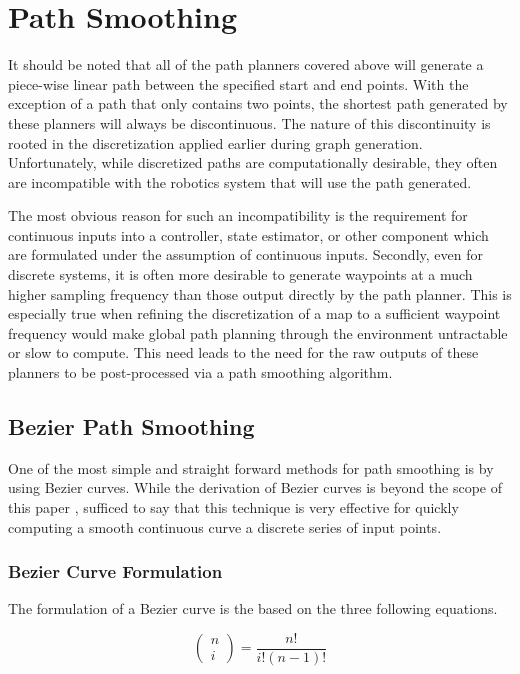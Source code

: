 \section{Path Smoothing}
It should be noted that all of the path planners covered above will generate a piece-wise linear path between the specified start and end points. With the exception of a path that only contains two points, the shortest path generated by these planners will always be discontinuous. The nature of this discontinuity is rooted in the discretization applied earlier during graph generation. Unfortunately, while discretized paths are computationally desirable, they often are incompatible with the robotics system that will use the path generated.

The most obvious reason for such an incompatibility is the requirement for continuous inputs into a controller, state estimator, or other component which are formulated under the assumption of continuous inputs. Secondly, even for discrete systems, it is often more desirable to generate waypoints at a much higher sampling frequency than those output directly by the path planner. This is especially true when refining the discretization of a map to a sufficient waypoint frequency would make global path planning through the environment untractable or slow to compute. This need leads to the need for the raw outputs of these planners to be post-processed via a path smoothing algorithm. 

\subsection{Bezier Path Smoothing}
One of the most simple and straight forward methods for path smoothing is by using Bezier curves. While the derivation of Bezier curves is beyond the scope of this paper \cite{bezier2018}, sufficed to say that this technique is very effective for quickly computing a smooth continuous curve a discrete series of input points.
\newline

\subsubsection{Bezier Curve Formulation}
The formulation of a Bezier curve is the based on the three following equations. 

\begin{equation}
    \left(\begin{array}{l}
    n \\
    i
    \end{array}\right)=\frac{n !}{i !(n-1) !}
\end{equation}

